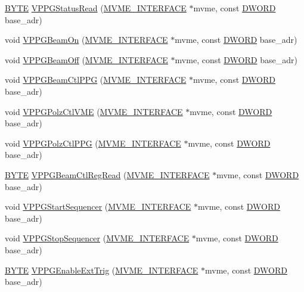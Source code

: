 \begin{DoxyCompactItemize}
\hyperlink{vt2_8h_a4ae1dab0fb4b072a66584546209e7d58}{BYTE} \hyperlink{vppg_8c_a23fc7a80ad391f80fc10a97417519980}{VPPGStatusRead} (\hyperlink{structMVME__INTERFACE}{MVME\_\-INTERFACE} $\ast$mvme, const \hyperlink{vt2_8h_a798af1e30bc65f319c1a246cecf59e39}{DWORD} base\_\-adr)
\item 
void \hyperlink{vppg_8c_acbbb2e3ab52f1662cfd8fba628ebf1ca}{VPPGBeamOn} (\hyperlink{structMVME__INTERFACE}{MVME\_\-INTERFACE} $\ast$mvme, const \hyperlink{vt2_8h_a798af1e30bc65f319c1a246cecf59e39}{DWORD} base\_\-adr)
\item 
void \hyperlink{vppg_8c_a2cdff7a4d21921939992eba5946ea4ad}{VPPGBeamOff} (\hyperlink{structMVME__INTERFACE}{MVME\_\-INTERFACE} $\ast$mvme, const \hyperlink{vt2_8h_a798af1e30bc65f319c1a246cecf59e39}{DWORD} base\_\-adr)
\item 
void \hyperlink{vppg_8c_a243cf578335a36f73dafcacfc457aaaa}{VPPGBeamCtlPPG} (\hyperlink{structMVME__INTERFACE}{MVME\_\-INTERFACE} $\ast$mvme, const \hyperlink{vt2_8h_a798af1e30bc65f319c1a246cecf59e39}{DWORD} base\_\-adr)
\item 
void \hyperlink{vppg_8c_a070407a7d64392ec20ad840d44ffb01c}{VPPGPolzCtlVME} (\hyperlink{structMVME__INTERFACE}{MVME\_\-INTERFACE} $\ast$mvme, const \hyperlink{vt2_8h_a798af1e30bc65f319c1a246cecf59e39}{DWORD} base\_\-adr)
\item 
void \hyperlink{vppg_8c_a28d2b68c7c0e8d305cc8dd37edfd7dec}{VPPGPolzCtlPPG} (\hyperlink{structMVME__INTERFACE}{MVME\_\-INTERFACE} $\ast$mvme, const \hyperlink{vt2_8h_a798af1e30bc65f319c1a246cecf59e39}{DWORD} base\_\-adr)
\item 
\hyperlink{vt2_8h_a4ae1dab0fb4b072a66584546209e7d58}{BYTE} \hyperlink{vppg_8c_a57fead0a3fec6c6b119298e43a26a3e5}{VPPGBeamCtlRegRead} (\hyperlink{structMVME__INTERFACE}{MVME\_\-INTERFACE} $\ast$mvme, const \hyperlink{vt2_8h_a798af1e30bc65f319c1a246cecf59e39}{DWORD} base\_\-adr)
\item 
void \hyperlink{vppg_8c_aa631062dec5475b71398bf970501a81b}{VPPGStartSequencer} (\hyperlink{structMVME__INTERFACE}{MVME\_\-INTERFACE} $\ast$mvme, const \hyperlink{vt2_8h_a798af1e30bc65f319c1a246cecf59e39}{DWORD} base\_\-adr)
\item 
void \hyperlink{vppg_8c_acabc3ac9c2749e8ad0d503643f3e48e3}{VPPGStopSequencer} (\hyperlink{structMVME__INTERFACE}{MVME\_\-INTERFACE} $\ast$mvme, const \hyperlink{vt2_8h_a798af1e30bc65f319c1a246cecf59e39}{DWORD} base\_\-adr)
\item 
\hyperlink{vt2_8h_a4ae1dab0fb4b072a66584546209e7d58}{BYTE} \hyperlink{vppg_8c_ad4f1d654e1523b2adb0a8007a4eedbef}{VPPGEnableExtTrig} (\hyperlink{structMVME__INTERFACE}{MVME\_\-INTERFACE} $\ast$mvme, const \hyperlink{vt2_8h_a798af1e30bc65f319c1a246cecf59e39}{DWORD} base\_\-adr)

\end{DoxyCompactItemize}
